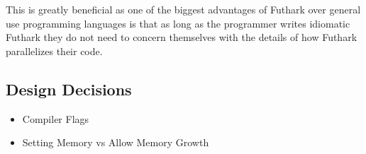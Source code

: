 \documentclass[11pt]{article}
\begin{document}
This is greatly beneficial as one of the biggest advantages of Futhark over general use programming languages is that as long as the programmer writes idiomatic Futhark they do not need to concern themselves with the details of how Futhark parallelizes their code. 

\subsection{Design Decisions}
\begin{itemize}
    \item Compiler Flags
    \item Setting Memory vs Allow Memory Growth
\end{itemize}
\end{document}
